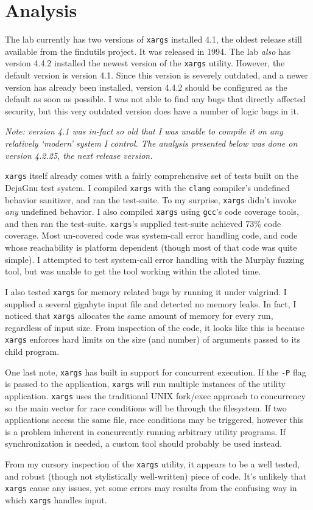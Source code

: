 \documentclass{article}
\newcommand{\xargs}{\texttt{xargs} }
\begin{document}
\vspace{-2ex}
\section{Analysis}
\vspace{-1ex}
The lab currently has two versions of \xargs installed 4.1, the oldest
release still available from the findutils project. It was released in 1994. The
lab \textit{also} has version 4.4.2 installed the newest version of the \xargs
utility. However, the default version is version 4.1. Since this version is
severely outdated, and a newer version has already been installed, version 4.4.2
should be configured as the default as soon as possible. I was not able to find
any bugs that directly affected security, but this very outdated version does
have a number of logic bugs in it.

\begin{center}
\parbox[c][1cm][c]{0.7\linewidth}{
    {\small \it Note: version 4.1 was in-fact so old that I was unable to compile it
     on any relatively `modern' system I control. The analysis presented below
     was done on version 4.2.25, the next release version.}
}
\end{center}

\xargs itself already comes with a fairly comprehensive set of tests built
on the DejaGnu test system. I compiled \xargs with the \texttt{clang} compiler's 
undefined behavior sanitizer, and ran the test-suite. To my surprise, 
\xargs didn't invoke \textit{any} undefined behavior. I also compiled \xargs 
using \texttt{gcc}'s code coverage tools, and then ran the test-suite. 
\texttt{xargs}'s supplied test-suite achieved 73\% code coverage. Most 
un-covered code was system-call error handling code, and code whose reachability
is platform dependent (though most of that code was quite simple). I attempted
to test system-call error handling with the Murphy fuzzing tool, but was unable
to get the tool working within the alloted time.

I also tested \xargs for memory related bugs by running it under valgrind. I supplied
a several gigabyte input file and detected no memory leaks. In fact, I noticed 
that \xargs allocates the same amount of memory for every run, regardless of 
input size. From inspection of the code, it looks like this is because \xargs
enforces hard limits on the size (and number) of arguments passed to its child
program.

One last note, \xargs has built in support for concurrent execution. If the \verb|-P|
flag is passed to the application, \xargs will run multiple instances of the 
utility application. \xargs uses the traditional UNIX fork/exec approach to 
concurrency so the main vector for race conditions will be through the filesystem.
If two applications access the same file, race conditions may be triggered, however
this is a problem inherent in concurrently running arbitrary utility programs.
If synchronization is needed, a custom tool should probably be used instead.

From my cursory inspection of the \xargs utility, it appears to be a well
tested, and robust (though not stylistically well-written) piece of code.
It's unlikely that \xargs cause any issues, yet some
errors may results from the confusing way in which \xargs handles input.
\end{document}
